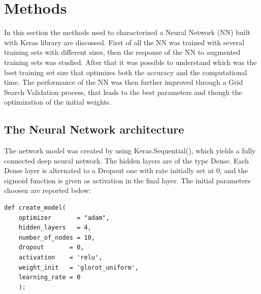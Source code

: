 \documentclass[prl,twocolumn]{revtex4-1}
\begin{document}
 \section{Methods}
In this section the methods used to characterized a Neural Network (NN) built with Keras library are discussed. First of all the NN was trained with several training sets with different sizes, then the response of the NN to augmented training sets was studied. 
After that it was possible to understand which was the best training set size that optimizes both the accuracy and the computational time. The performance of the NN was then further improved through a Grid Search Validation process, that leads to the best parameters and though the optimization of the initial weights.
\subsection{The Neural Network architecture}
The network model was created by using Keras.Sequential(), which yields a fully connected deep neural network. The hidden layers are of the type Dense. Each Dense layer is alternated to a Dropout one with rate initially set at 0, and the sigmoid function is given as activation in the final layer. 
The initial parameters choosen are reported below:

\begin{lstlisting}[style=python]
def create_model(
    optimizer       = "adam",
    hidden_layers   = 4,
    number_of_nodes = 10,
    dropout       = 0,
    activation    = 'relu',
    weight_init   = 'glorot_uniform',
    learning_rate = 0
    ):
\end{lstlisting}
\end{document}
